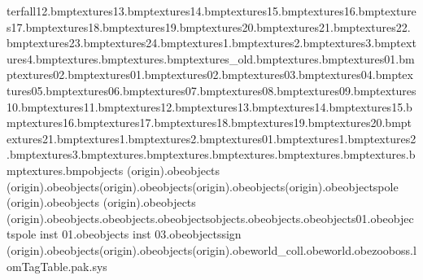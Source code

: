 terfall12.bmp textures\waterfall13.bmp textures\waterfall14.bmp textures\waterfall15.bmp textures\waterfall16.bmp textures\waterfall17.bmp textures\waterfall18.bmp textures\waterfall19.bmp textures\waterfall20.bmp textures\waterfall21.bmp textures\waterfall22.bmp textures\waterfall23.bmp textures\waterfall24.bmp textures\wbridge1.bmp textures\wbridge2.bmp textures\wbridge3.bmp textures\wbridge4.bmp textures\web.bmp textures\window.bmp textures\window_old.bmp textures\wires.bmp textures\woodblock01.bmp textures\woodblock02.bmp textures\wpaper01.bmp textures\wpaper02.bmp textures\wpaper03.bmp textures\wpaper04.bmp textures\wpaper05.bmp textures\wpaper06.bmp textures\wpaper07.bmp textures\wpaper08.bmp textures\wpaper09.bmp textures\wpaper10.bmp textures\wpaper11.bmp textures\wpaper12.bmp textures\wpaper13.bmp textures\wpaper14.bmp textures\wpaper15.bmp textures\wpaper16.bmp textures\wpaper17.bmp textures\wpaper18.bmp textures\wpaper19.bmp textures\wpaper20.bmp textures\wpaper21.bmp textures\wpaperfish1.bmp textures\wpaperfish2.bmp textures\zoorails01.bmp textures\zoosign1.bmp textures\zoosign2.bmp textures\zoosign3.bmp textures\tsambutton.bmp textures\tsamankles.bmp textures\tsamtie.bmp textures\tsamcollar.bmp textures\eyetex.bmp textures\tsamteeth.bmp objects  (origin).obe objects  (origin).obe objects\bush  (origin).obe objects\bench  (origin).obe objects\trashcan  (origin).obe objects\telegraph pole (origin).obe objects (origin).obe objects  (origin).obe objects\camerapos.obe objects\cameracases.obe objects\invisible objects.obe objects\cameralookat.obe objects\box01.obe objects\telegraph pole inst 01.obe objects inst 03.obe objects\city sign (origin).obe objects\zoogatel (origin).obe objects\zoogater (origin).obe world_coll.obe world.obe zooboss.lom TagTable.pak.sys 